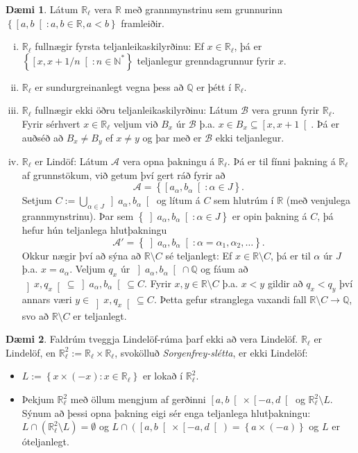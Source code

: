 \documentclass[a4paper,icelandic]{book}
\theoremstyle{definition}
\newtheorem{daemi}{Dæmi}[section]
\theoremstyle{plain}
\theoremstyle{remark}
\newcommand{\R}{\mathbb{R}} %
\newcommand{\N}{\mathbb{N}} %
\newcommand{\Q}{\mathbb{Q}} %
\begin{document}
\begin{daemi}
  Látum $\R_\ell$ vera $\R$ með grannmynstrinu sem grunnurinn $\left\{
  \left[a,b\right[ : a,b\in\R, a<b \right\}$ framleiðir.
  \begin{enumerate}[(i)]
    \item $\R_\ell$ fullnægir fyrsta teljanleikaskilyrðinu: Ef
      $x\in\R_\ell$, þá er $\left\{ \left[x,x+1/n\right[ : n\in\N^*
      \right\}$ teljanlegur grenndagrunnur fyrir $x$.
    \item $\R_\ell$ er sundurgreinanlegt vegna þess að $\Q$ er þétt í
      $\R_\ell$. 
    \item $\R_\ell$ fullnægir ekki öðru teljanleikaskilyrðinu: Látum
      $\mathcal B$ vera grunn fyrir $\R_\ell$. Fyrir
      sérhvert $x\in\R_\ell$ veljum við $B_x$ úr $\mathcal B$ þ.a. $x\in
      B_x\subseteq \left[x,x+1\right[$. Þá er auðséð að $B_x\neq B_y$ ef
      $x\neq y$ og þar með er $\mathcal B$ ekki teljanlegur.
    \item $\R_\ell$ er Lindöf: Látum $\mathcal A$ vera opna þakningu á
      $\R_\ell$. Þá er til fínni þakning á $\R_\ell$ af grunnstökum,
      við getum því gert ráð fyrir að\[
      \mathcal A 
      = \left\{ 
        \left[a_\alpha, b_\alpha\right[ : \alpha\in J
      \right\}.
      \]
      Setjum $C := \bigcup_{\alpha\in J}\left]a_\alpha,b_\alpha\right[$
      og lítum á $C$ sem hlutrúm í $\R$ (með venjulega grannmynstrinu).
      Þar sem $\left\{ \left]a_\alpha,b_\alpha \right[ : \alpha\in J
      \right\}$ er opin þakning á $C$, þá  hefur hún teljanlega
      hlutþakningu\[
      \mathcal A'
      = \left\{ \left]a_\alpha,b_\alpha\right[ :
      \alpha=\alpha_1,\alpha_2,\dots \right\}.
      \]
      Okkur nægir því að sýna að $\R\setminus C$ sé teljanlegt: Ef
      $x\in\R\setminus C$, þá er til $\alpha$ úr $J$ þ.a. $x=a_\alpha$.
      Veljum $q_x$ úr $\left]a_\alpha,b_\alpha\right[\cap\Q$ og fáum að
      $\left]x,q_x\right[\subseteq\left]a_\alpha,b_\alpha\right[\subseteq
      C$. Fyrir $x,y\in\R\setminus C$ þ.a. $x<y$ gildir að $q_x<q_y$ því 
      annars væri $y\in\left]x,q_x\right[\subseteq C$. Þetta gefur
      stranglega vaxandi fall $\R\setminus C\to \Q$, svo að $\R\setminus
      C$ er teljanlegt.
  \end{enumerate}
\end{daemi}
\begin{daemi}
  Faldrúm tveggja Lindelöf-rúma þarf ekki að vera Lindelöf. $\R_\ell$ er
  Lindelöf, en $\R_\ell^2 := \R_\ell\times\R_\ell$, svokölluð
  \emph{Sorgenfrey-slétta}, er ekki Lindelöf:
  \begin{itemize}
    \item $L := \left\{ x\times(-x) : x\in\R_\ell \right\}$ er lokað í
      $\R_\ell^2$.
    \item Þekjum $\R_\ell^2$ með öllum mengjum af gerðinni
      $\left[a,b\right[\times\left[-a,d\right[$ og $\R_\ell^2\setminus
      L$. Sýnum að þessi opna þakning eigi sér enga teljanlega
      hlutþakningu: $L\cap (\R_\ell^2\setminus L) = \emptyset$ og
      $L\cap(\left[a,b\right[ \times \left[-a,d\right[ ) = \left\{
      a\times(-a) \right\}$ og $L$ er óteljanlegt.
  \end{itemize}
\end{daemi}
\end{document}
